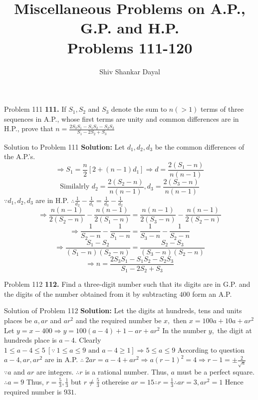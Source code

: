 \documentclass[aspectratio=1610,8pt]{beamer}
\title{Miscellaneous Problems on A.P., G.P. and H.P.\\Problems 111-120}
\author[Shiv Shankar Dayal]{Shiv Shankar Dayal}
\begin{document}
\begin{frame}
  \titlepage
\end{frame}
\begin{frame}{Problem 111}
  \textbf{111.} If $S_1, S_2$ and $S_3$ denote the sum to $n(> 1)$ terms of three sequences in A.P., whose first terms are unity
  and common differences are in H.P., prove that $n = \frac{2S_3S_1 - S_1S_2 - S_2S_3}{S_1 - 2S_2 + S_3}$
\end{frame}
\begin{frame}{Solution to Problem 111}
  \textbf{Solution:} Let $d_1, d_2, d_3$ be the common differences of the A.P.'s.
  $$\Rightarrow S_1 = \frac{n}{2}[2 + (n - 1)d_1]\Rightarrow d = \frac{2(S_1 - n)}{n(n - 1)}$$
  $$\text{Similalrly~}d_2 = \frac{2(S_2 - n)}{n(n - 1)}, d_3 = \frac{2(S_3 - n)}{n(n - 1)}$$
  $\because d_1, d_2, d_3$ are in H.P. $\therefore \frac{1}{d_2} - \frac{1}{d_1} = \frac{1}{d_3} - \frac{1}{d_2}$
  $$\Rightarrow \frac{n(n - 1)}{2(S_2 - n)} - \frac{n(n - 1)}{2(S_1 - n)} = \frac{n(n - 1)}{2(S_3 - n)} - \frac{n(n - 1)}{2(S_2 -
    n)}$$
  $$\Rightarrow \frac{1}{S_2 - n} - \frac{1}{S_1 - n} = \frac{1}{S_3 -n} - \frac{1}{S_2 -n}$$
  $$\Rightarrow \frac{S_1 - S_2}{(S_1 - n)(S_2 - n)} = \frac{S_2 - S_3}{(S_3 - n)(S_2 - n)}$$
  $$\Rightarrow n = \frac{2S_3S_1 - S_1S_2 - S_2S_3}{S_1 - 2S_2 + S_3}$$
\end{frame}
\begin{frame}{Problem 112}
  \textbf{112.} Find a three-digit number such that its digits are in G.P. and the digits of the number obtained from it by
  subtracting $400$ form an A.P.
\end{frame}
\begin{frame}{Solution of Problem 112}
  \textbf{Solution:} Let the digits at hundreds, tens and units places be $a, ar$ and $ar^2$ and the required number be $x,$ then
  $x = 100a + 10a + ar^2$
  \linebreak\linebreak
  Let $y = x - 400 \Rightarrow y = 100(a - 4) + 1 - ar + ar^2$ In the number $y,$ the digit at hundreds place is $a - 4.$ Clearly
  \linebreak\linebreak
  $1\leq a - 4\leq 5~[\because~1\leq a \leq 9 \text{~and~}a - 4\geq 1] \Rightarrow 5\leq a\leq 9$
  \linebreak\linebreak
  According to question $a - 4, ar, ar^2$ are in A.P. $\therefore~ 2ar = a - 4 + ar^2\Rightarrow a(r - 1)^2 = 4\Rightarrow r - 1 =
  \pm\frac{2}{\sqrt{a}}$
  \linebreak\linebreak
  $\because a$ and $ar$ are integers. $\therefore r$ is a rational number. Thus, $a$ must be a perfect square. $\therefore a = 9$
  \linebreak\linebreak
  Thus, $r = \frac{5}{3}, \frac{1}{3}$ but $r\neq \frac{5}{3}$ othereise $ar = 15\therefore r = \frac{1}{3}\therefore ar = 3, ar^2
  = 1$
  \linebreak\linebreak
  Hence required number is $931.$
\end{frame}
\end{document}
